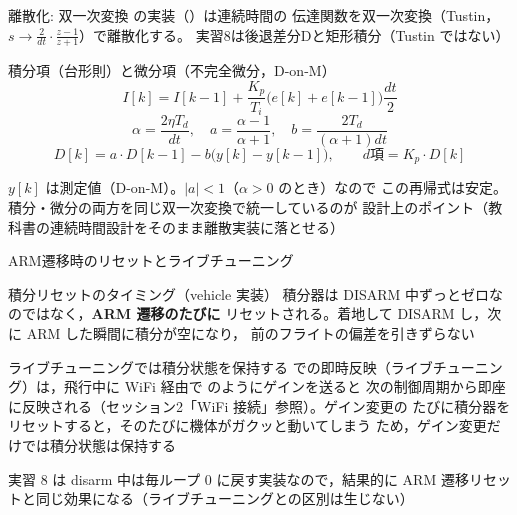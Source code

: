 \begin{frame}{離散化: 双一次変換\later}
  {\footnotesize {} の実装（）は連続時間の
  伝達関数を双一次変換（Tustin，$s\to\frac{2}{dt}\cdot\frac{z-1}{z+1}$）で離散化する。
  実習8は後退差分Dと矩形積分（Tustin ではない）}

  \begin{block}{積分項（台形則）と微分項（不完全微分，D-on-M）}\footnotesize
    \setlength{\abovedisplayskip}{2pt}\setlength{\belowdisplayskip}{2pt}%
    \[
      I[k] = I[k-1] + \frac{K_p}{T_i}\bigl(e[k]+e[k-1]\bigr)\frac{dt}{2}
    \]
    \[
      \alpha = \frac{2\eta T_d}{dt}, \quad
      a = \frac{\alpha-1}{\alpha+1}, \quad
      b = \frac{2T_d}{(\alpha+1)dt}
    \]
    \[
      D[k] = a\cdot D[k-1] - b\bigl(y[k]-y[k-1]\bigr), \qquad
      d\text{項} = K_p \cdot D[k]
    \]
  \end{block}

  {\footnotesize $y[k]$ は測定値（D-on-M）。$|a|<1$（$\alpha>0$ のとき）なので
  この再帰式は安定。積分・微分の両方を同じ双一次変換で統一しているのが
  設計上のポイント（教科書の連続時間設計をそのまま離散実装に落とせる）}
\end{frame}

\begin{frame}{ARM遷移時のリセットとライブチューニング\later}
  \begin{exampleblock}{積分リセットのタイミング（vehicle 実装）}\footnotesize
    積分器は DISARM 中ずっとゼロなのではなく，\textbf{ARM 遷移のたびに}
    リセットされる。着地して DISARM し，次に ARM した瞬間に積分が空になり，
    前のフライトの偏差を引きずらない
  \end{exampleblock}

  \vspace{0.4em}

  \begin{block}{ライブチューニングでは積分状態を保持する}\footnotesize
     での即時反映（ライブチューニング）は，飛行中に
    WiFi 経由で  のようにゲインを送ると
    次の制御周期から即座に反映される（セッション2「WiFi 接続」参照）。ゲイン変更の
    たびに積分器をリセットすると，そのたびに機体がガクッと動いてしまう
    ため，ゲイン変更だけでは積分状態は保持する
  \end{block}

  \vspace{0.3em}

  {\footnotesize 実習 8 は disarm 中は毎ループ 0 に戻す実装なので，結果的に
  ARM 遷移リセットと同じ効果になる（ライブチューニングとの区別は生じない）}
\end{frame}

